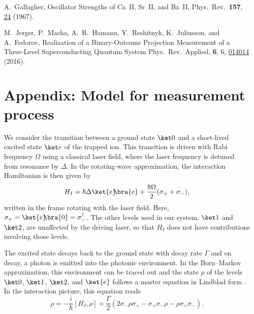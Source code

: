 \documentclass[
aps,prl,
reprint,
a4paper,
superscriptaddress,
floatfix,
]{revtex4-1}
\renewcommand{\doi}[2]{{\href{http://doi.org/#1}{#2}}}
\newcommand{\ketbra}[2]{{\ket{#1}\!\!\bra{#2}}}
\newcommand{\proj}[1]{{\ketbra{#1}{#1}}}
\begin{document}
\begin{thebibliography}{99}
%
A.\ Gallagher,
Oscillator Strengths of Ca~II, Sr~II, and Ba~II,
Phys.\ Rev.\ \textbf{157}, \doi{10.1103/PhysRev.157.24}{24} (1967).

%
M.\ Jerger, P.\ Macha, A.\ R.\ Hamann, Y.\ Reshitnyk, K.\ Juliusson, and A.\ Fedorov,
Realization of a Binary-Outcome Projection Measurement of a Three-Level Superconducting Quantum System
Phys.\ Rev.\ Applied, \textbf{6}, 6, \doi{10.1103/PhysRevApplied.6.014014}{014014} (2016).

\end{thebibliography}

\appendix
\section{Appendix: Model for measurement process}
We consider the transition between a ground state $\ket0$ and a short-lived 
 excited state $\ket e$ of the trapped ion.
This transition is driven with Rabi frequency $\Omega$
 using a classical laser field, where the laser frequency is detuned from resonance by $\Delta$.
In the rotating-wave approximation, the interaction Hamiltonian is then given 
 by \cite{Carmichael93}
%
\begin{equation}
 H_I= \hbar \Delta \proj{e}+ \frac{\hbar\Omega}2 (\sigma_+ + \sigma_-),
\end{equation}
%
 written in the frame rotating with the laser field.
Here, $\sigma_+= \ketbra{e}0= \sigma_-^\dag$.
The other levels used in our system, $\ket1$ and $\ket2$, are unaffected by the 
 driving laser, so that $H_I$ does not have contributions involving those 
 levels.

The excited state decays back to the ground state with decay rate $\Gamma$ and 
 on decay, a photon is emitted into the photonic environment.
In the Born--Markov approximation, this environment can be traced out and the 
 state $\rho$ of the levels $\ket0$, $\ket1$, $\ket2$, and $\ket{e}$ follows a 
 master equation in Lindblad form \cite{Carmichael93}.
In the interaction picture, this equation reads
%
\begin{equation}\label{eq:master}
 \dot{\rho}= -\frac{i}{\hbar}[H_I,\rho]+
 \frac\Gamma2(2\sigma_-\rho \sigma_+-\sigma_+ \sigma_-\rho-\rho \sigma_+ 
\sigma_-).
\end{equation}
\end{document}
